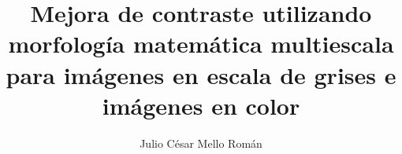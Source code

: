 \documentclass[final,fmstyle,unknownkeysallowed]{./util/fpunathesis}
\title{Mejora de contraste utilizando morfología matemática multiescala para imágenes en escala de grises e imágenes en color}
\author{Julio César Mello Román}
\begin{document}
	

\maketitle     %






\tableofcontents
\listoffigures
\listoftables
%



\listofsymbols

\mainmatter  %







%

\appendix   %

%
\printbibliography


\end{document}
